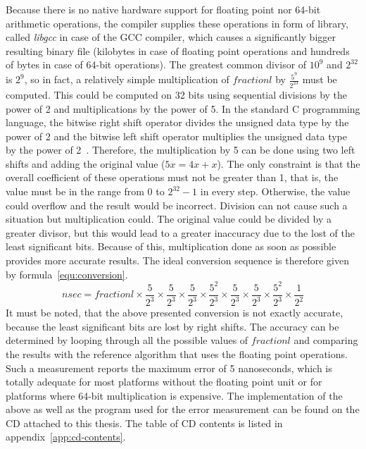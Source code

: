 Because there is no native hardware support for floating point nor 64-bit arithmetic operations,
the compiler supplies these operations in form of library, called {\it{libgcc}} in case of the GCC compiler,
which causes a significantly bigger resulting binary file
(kilobytes in case of floating point operations and hundreds of bytes in case of 64-bit operations).
The greatest common divisor of $10^9$ and $2^{32}$ is $2^9$,
so in fact, a relatively simple multiplication of $fractionl$ by $\frac{5^9}{2^{23}}$ must be computed.
This could be computed on 32 bits using sequential
divisions by the power of 2 and multiplications by the power of 5.
In the standard C programming language, the bitwise right shift operator divides the unsigned data type by the power of 2
and the bitwise left shift operator multiplies the unsigned data type by the power of 2~\cite{c99}.
Therefore, the multiplication by 5 can be done using two left shifts and
adding the original value ($5x = 4x + x$).
The only constraint is that the overall coefficient of these operations must not be greater than 1,
that is, the value must be in the range from $0$ to $2^{32}-1$ in every step.
Otherwise, the value could overflow and the result would be incorrect.
Division can not cause such a situation but multiplication could.
The original value could be divided by a greater divisor,
but this would lead to a greater inaccuracy due to the lost of the least significant bits.
Because of this, multiplication done as soon as possible provides more accurate results.
The ideal conversion sequence is therefore given by formula~\ref{equ:conversion}.
\begin{equation}
\label{equ:conversion}
nsec = fractionl \times \frac{5}{2^3} \times \frac{5}{2^3} \times \frac{5}{2^3} \times \frac{5^2}{2^3} \times \frac{5}{2^3}  \times \frac{5}{2^3} \times \frac{5^2}{2^3} \times \frac{1}{2^2}
\end{equation}
It must be noted, that the above presented conversion is not exactly accurate,
because the least significant bits are lost by right shifts. %
The accuracy can be determined by looping through all the possible values of $fractionl$ %
and comparing the results with the reference algorithm that uses the floating point operations.
Such a measurement reports the maximum error of 5 nanoseconds,
which is totally adequate for most platforms without the floating point unit or
for platforms where 64-bit multiplication is expensive.
The implementation of the above as well as the program used for the
error measurement can be found on the CD attached to this thesis.
The table of CD contents is listed in appendix~\ref{app:cd-contents}.

